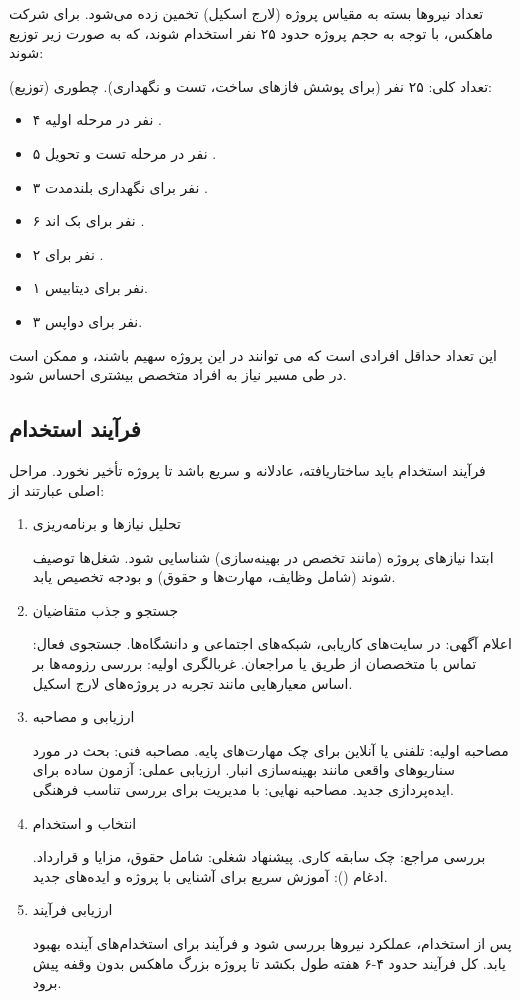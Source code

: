 \documentclass[12pt,a4paper]{report}
\begin{document}
تعداد نیروها بسته به مقیاس پروژه (لارج اسکیل) تخمین زده می‌شود. برای شرکت ماهکس، با توجه به حجم پروژه حدود ۲۵ نفر استخدام شوند، که به صورت زیر توزیع شوند:

	تعداد کلی: ۲۵ نفر (برای پوشش فازهای ساخت، تست و نگهداری).
چطوری (توزیع):
\begin{itemize}
	\item
	۴ نفر در مرحله اولیه .
	\item 
	۵ نفر در مرحله تست و تحویل .
	\item 
	۳ نفر برای نگهداری بلندمدت .
\item 
۶ نفر برای بک اند .
\item 
۲ نفر برای .

\item 
۱ نفر برای دیتابیس.
\item 
۳ نفر برای دواپس.

\end{itemize}
این تعداد حداقل افرادی است که می توانند در این پروژه سهیم باشند، و ممکن است در طی مسیر نیاز به افراد متخصص بیشتری احساس شود.


\subsection{فرآیند استخدام }

فرآیند استخدام باید ساختاریافته، عادلانه و سریع باشد تا پروژه تأخیر نخورد. مراحل اصلی عبارتند از:
\begin{enumerate}
	\item

 تحلیل نیازها و برنامه‌ریزی

ابتدا نیازهای پروژه (مانند تخصص در بهینه‌سازی) شناسایی شود. شغل‌ها توصیف شوند (شامل وظایف، مهارت‌ها و حقوق) و بودجه تخصیص یابد.

\item 
 جستجو و جذب متقاضیان


اعلام آگهی: در سایت‌های کاریابی، شبکه‌های اجتماعی و دانشگاه‌ها.
جستجوی فعال: تماس با متخصصان از طریق  یا مراجعان.
غربالگری اولیه: بررسی رزومه‌ها بر اساس معیارهایی مانند تجربه در پروژه‌های لارج اسکیل.


\item 
 ارزیابی و مصاحبه


مصاحبه اولیه: تلفنی یا آنلاین برای چک مهارت‌های پایه.
مصاحبه فنی: بحث در مورد سناریوهای واقعی مانند بهینه‌سازی انبار.
ارزیابی عملی: آزمون ساده برای ایده‌پردازی جدید.
مصاحبه نهایی: با مدیریت برای بررسی تناسب فرهنگی.


\item 
 انتخاب و استخدام


بررسی مراجع: چک سابقه کاری.
پیشنهاد شغلی: شامل حقوق، مزایا و قرارداد.
ادغام (): آموزش سریع برای آشنایی با پروژه و ایده‌های جدید.

\item
 ارزیابی فرآیند

پس از استخدام، عملکرد نیروها بررسی شود و فرآیند برای استخدام‌های آینده بهبود یابد. کل فرآیند حدود ۴-۶ هفته طول بکشد تا پروژه بزرگ ماهکس بدون وقفه پیش برود.
\end{enumerate}
\newpage
\end{document}
